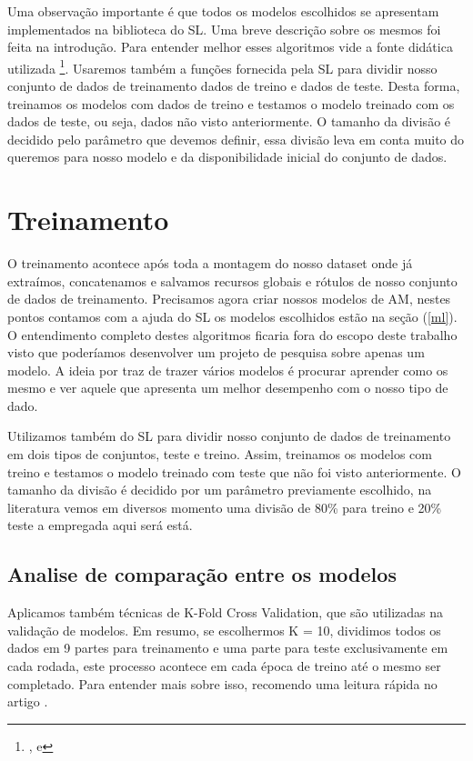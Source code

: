 Uma observação importante é que todos os modelos escolhidos se apresentam implementados na biblioteca do SL. Uma breve descrição sobre os mesmos foi feita na introdução. Para entender melhor esses algoritmos vide a fonte didática utilizada \footnote{,  e }. Usaremos também a funções fornecida pela SL para dividir nosso conjunto de dados de treinamento dados de treino e dados de teste. Desta forma, treinamos os modelos com dados de treino e testamos o modelo treinado com os dados de teste, ou seja, dados não visto anteriormente. O tamanho da divisão é decidido pelo parâmetro que devemos definir, essa divisão leva em conta muito do queremos para nosso modelo e da disponibilidade inicial do conjunto de dados. 

\section{Treinamento} 

 O treinamento acontece após toda a montagem do nosso dataset onde já extraímos, concatenamos e salvamos recursos globais e rótulos de nosso conjunto de dados de treinamento. Precisamos agora criar nossos modelos de AM, nestes pontos contamos com a ajuda do SL os modelos escolhidos estão na seção (\ref{ml}). O entendimento completo destes algoritmos ficaria fora do escopo deste trabalho visto que poderíamos desenvolver um projeto de pesquisa sobre apenas um modelo. A ideia por traz de trazer vários modelos é procurar aprender como os mesmo e ver aquele que apresenta um melhor desempenho com o nosso tipo de dado. 

Utilizamos também do SL para dividir nosso conjunto de dados de treinamento em dois tipos de conjuntos, teste e treino. Assim, treinamos os modelos com treino e testamos o modelo treinado com teste que não foi visto anteriormente. O tamanho da divisão é decidido por um parâmetro previamente escolhido, na literatura \cite{astroml2} vemos em diversos momento uma divisão de 80\% para treino e 20\% teste a empregada aqui será está. 

\subsection{Analise de comparação entre os modelos}

Aplicamos também técnicas de K-Fold Cross Validation, que são utilizadas na validação de modelos. Em resumo, se escolhermos K = 10, dividimos todos os dados em 9 partes para treinamento e uma parte para teste exclusivamente em cada rodada, este processo acontece em cada época de treino até o mesmo ser completado. Para entender mais sobre isso, recomendo uma leitura rápida no artigo . 

